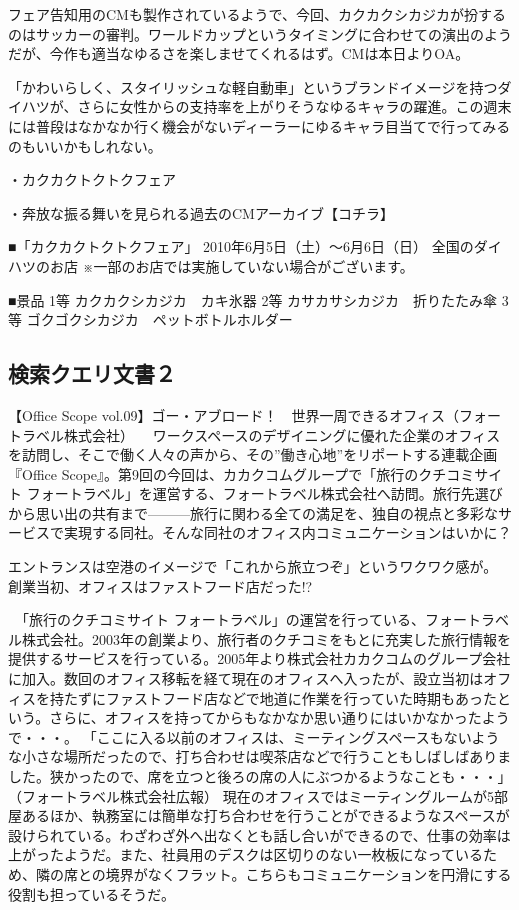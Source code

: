 \documentclass[a4paper,12pt]{jsreport}
\begin{document}
フェア告知用のCMも製作されているようで、今回、カクカクシカジカが扮するのはサッカーの審判。ワールドカップというタイミングに合わせての演出のようだが、今作も適当なゆるさを楽しませてくれるはず。CMは本日よりOA。

「かわいらしく、スタイリッシュな軽自動車」というブランドイメージを持つダイハツが、さらに女性からの支持率を上がりそうなゆるキャラの躍進。この週末には普段はなかなか行く機会がないディーラーにゆるキャラ目当てで行ってみるのもいいかもしれない。

・カクカクトクトクフェア

・奔放な振る舞いを見られる過去のCMアーカイブ【コチラ】

■「カクカクトクトクフェア」
2010年6月5日（土）〜6月6日（日）
全国のダイハツのお店
※一部のお店では実施していない場合がございます。

■景品
1等 カクカクシカジカ　カキ氷器
2等 カサカサシカジカ　折りたたみ傘
3等 ゴクゴクシカジカ　ペットボトルホルダー

\newpage
\subsection{検索クエリ文書２}

【Office Scope vol.09】ゴー・アブロード！　世界一周できるオフィス（フォートラベル株式会社）
　ワークスペースのデザイニングに優れた企業のオフィスを訪問し、そこで働く人々の声から、その”働き心地”をリポートする連載企画『Office Scope』。第9回の今回は、カカクコムグループで「旅行のクチコミサイト フォートラベル」を運営する、フォートラベル株式会社へ訪問。旅行先選びから思い出の共有まで———旅行に関わる全ての満足を、独自の視点と多彩なサービスで実現する同社。そんな同社のオフィス内コミュニケーションはいかに？
 
エントランスは空港のイメージで「これから旅立つぞ」というワクワク感が。
創業当初、オフィスはファストフード店だった!?

　「旅行のクチコミサイト フォートラベル」の運営を行っている、フォートラベル株式会社。2003年の創業より、旅行者のクチコミをもとに充実した旅行情報を提供するサービスを行っている。2005年より株式会社カカクコムのグループ会社に加入。数回のオフィス移転を経て現在のオフィスへ入ったが、設立当初はオフィスを持たずにファストフード店などで地道に作業を行っていた時期もあったという。さらに、オフィスを持ってからもなかなか思い通りにはいかなかったようで・・・。
「ここに入る以前のオフィスは、ミーティングスペースもないような小さな場所だったので、打ち合わせは喫茶店などで行うこともしばしばありました。狭かったので、席を立つと後ろの席の人にぶつかるようなことも・・・」（フォートラベル株式会社広報）
現在のオフィスではミーティングルームが5部屋あるほか、執務室には簡単な打ち合わせを行うことができるようなスペースが設けられている。わざわざ外へ出なくとも話し合いができるので、仕事の効率は上がったようだ。また、社員用のデスクは区切りのない一枚板になっているため、隣の席との境界がなくフラット。こちらもコミュニケーションを円滑にする役割も担っているそうだ。
\end{document}
